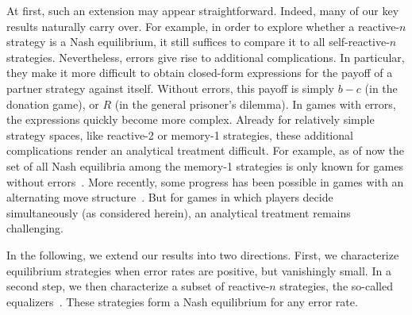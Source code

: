 \documentclass[9pt,twoside,lineno]{pnas-new}
\theoremstyle{plainCl1}
\theoremstyle{plainCl2}
\begin{document}
At first, such an extension may appear straightforward. 
Indeed, many of our key results naturally carry over. 
For example, in order to explore whether a reactive-$n$ strategy is a Nash equilibrium, it still suffices to compare it to all self-reactive-$n$ strategies.
Nevertheless, errors give rise to additional complications. 
In particular, they make it more difficult to obtain closed-form expressions for the payoff of a partner strategy against itself. 
Without errors, this payoff is simply $b\!-\!c$ (in the donation game), or $R$ (in the general prisoner's dilemma). 
In games with errors, the expressions quickly become more complex. 
Already for relatively simple strategy spaces, like reactive-2 or memory-1 strategies, these additional complications render an analytical treatment difficult. 
For example, as of now the set of all Nash equilibria among the memory-1 strategies is only known for games without errors~\citep{akin:EGADS:2016,stewart:pnas:2014}. 
More recently, some progress has been possible in games with an alternating move structure~\citep{park:NComms:2022}. 
But for games in which players decide simultaneously (as considered herein), an analytical treatment remains challenging.

In the following, we extend our results into two directions. 
First, we characterize equilibrium strategies when error rates are positive, but vanishingly small. 
In a second step, we then characterize a subset of reactive-$n$ strategies, the so-called equalizers~\citep{boerlijst:AMM:1997,press:PNAS:2012}. 
These strategies form a Nash equilibrium for any error rate. 
\end{document}
